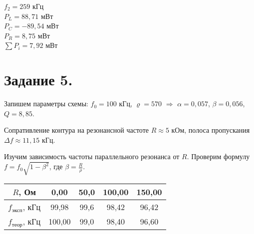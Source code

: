 	\begin{center}
		$f_2 = 259$      кГц   \\
		$P_L = 88,71$  мВт   \\
		$P_C = -89,54$   мВт   \\
		$P_R = 8,75$ мВт   \\
		$\sum P_i = 7,92$ мВт \\
	\end{center}


	\section{Задание 5.}

	\noindent Запишем параметры схемы: $f_0 = 100$ кГц, $\varrho = 570$ $\Rightarrow$ $\alpha = 0,057$, $\beta = 0,056$, $Q = 8,85$.


	\noindent Сопративление контура на резонансной частоте $R \approx 5$ кОм, полоса пропускания $\Delta f \approx 11,15$ кГц.


	\noindent Изучим зависимость частоты параллельного резонанса от $R$. Проверим формулу $f = f_0 \sqrt{1 - \beta^2}$, где $\beta = \frac{R}{\rho}$.

	\begin{table}[h!]
		\begin{center}
			\begin{tabular}{|c|c|c|c|c|}
				\hline
				$R$, Ом                  & 0,00   & 50,0 & 100,00  & 150,00  \\ \hline
				$f_{\text{эксп}}$, кГц   & 99,98  & 99,6 & 98,42   & 96,42   \\ \hline
				$f_{\text{теор}}$, кГц   & 100,00 & 99,0 & 98,40   & 96,60   \\ \hline
			\end{tabular}
		\end{center}
	\end{table}


